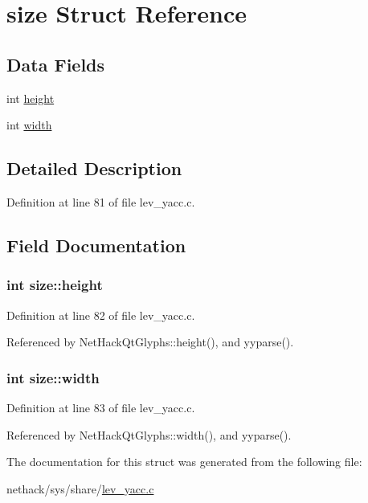 \hypertarget{structsize}{\section{size Struct Reference}
\label{structsize}
}
\subsection*{Data Fields}
\begin{DoxyCompactItemize}
\item 
int \hyperlink{structsize_a0ce404630bf4cf87ce2d02f2db8b6c93}{height}
\item 
int \hyperlink{structsize_afd8efe4755a96dfc77d03cb9bc02eb62}{width}
\end{DoxyCompactItemize}


\subsection{Detailed Description}


Definition at line 81 of file lev\+\_\+yacc.\+c.



\subsection{Field Documentation}
\hypertarget{structsize_a0ce404630bf4cf87ce2d02f2db8b6c93}{
\subsubsection[{height}]{\setlength{\rightskip}{0pt plus 5cm}int size\+::height}}\label{structsize_a0ce404630bf4cf87ce2d02f2db8b6c93}


Definition at line 82 of file lev\+\_\+yacc.\+c.



Referenced by Net\+Hack\+Qt\+Glyphs\+::height(), and yyparse().

\hypertarget{structsize_afd8efe4755a96dfc77d03cb9bc02eb62}{
\subsubsection[{width}]{\setlength{\rightskip}{0pt plus 5cm}int size\+::width}}\label{structsize_afd8efe4755a96dfc77d03cb9bc02eb62}


Definition at line 83 of file lev\+\_\+yacc.\+c.



Referenced by Net\+Hack\+Qt\+Glyphs\+::width(), and yyparse().



The documentation for this struct was generated from the following file\+:\begin{DoxyCompactItemize}
\item 
nethack/sys/share/\hyperlink{lev__yacc_8c}{lev\+\_\+yacc.\+c}\end{DoxyCompactItemize}
